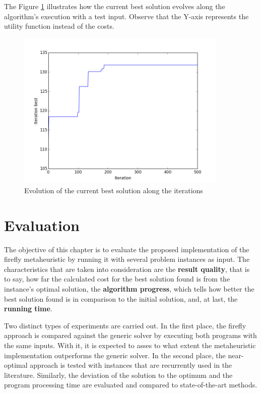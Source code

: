 \documentclass[tuberlin,cic,tc,openright,english,noabntcite,oneside]{iiufrgs}
\begin{document}
The Figure \ref{fig:best-solution-evolution} illustrates how the current best solution evolves along the algorithm's execution with a test input. Observe that the Y-axis represents the utility function instead of the costs.
\begin{figure}[H]
	\centering
    \caption{Evolution of the current best solution along the iterations}
    \includegraphics[width=0.9\textwidth]{fig_best_sol_evolution}\par
    \label{fig:best-solution-evolution}
\end{figure}

\chapter{Evaluation}\label{sec:evaluation}
The objective of this chapter is to evaluate the proposed implementation of the firefly metaheuristic by running it with several problem instances as input. The characteristics that are taken into consideration are the \textbf{result quality}, that is to say, how far the calculated cost for the best solution found is from the instance's optimal solution, the \textbf{algorithm progress}, which tells how better the best solution found is in comparison to the initial solution, and, at last, the \textbf{running time}.

Two distinct types of experiments are carried out. In the first place, the firefly approach is compared against the generic solver by executing both programs with the same inputs. With it, it is expected to asses to what extent the metaheuristic implementation outperforms the generic solver. In the second place, the near-optimal approach is tested with instances that are recurrently used in the literature. Similarly, the deviation of the solution to the optimum and the program processing time are evaluated and compared to state-of-the-art methods.
\end{document}

